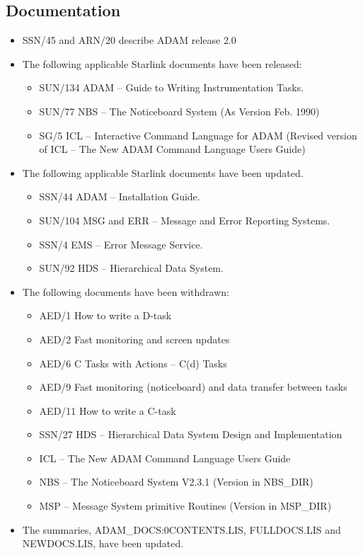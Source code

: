\subsection{Documentation}
\label{docs}
\begin{itemize}
\item SSN/45 and ARN/20 describe ADAM release 2.0
\item The following applicable Starlink documents have been released:
\begin{itemize}
\item SUN/134 ADAM -- Guide to Writing Instrumentation Tasks.
\item SUN/77 NBS -- The Noticeboard System (As Version Feb. 1990)
\item SG/5 ICL -- Interactive Command Language for ADAM (Revised version of
ICL -- The New ADAM Command Language Users Guide)
\end{itemize}
\item The following applicable Starlink documents have been updated.
\begin{itemize}
\item SSN/44 ADAM -- Installation Guide.
\item SUN/104 MSG and ERR -- Message and Error Reporting Systems.
\item SSN/4 EMS -- Error Message Service.
\item SUN/92 HDS -- Hierarchical Data System.
\end{itemize}
\item The following documents have been withdrawn:
\begin{itemize}
\item AED/1 How to write a D-task
\item AED/2 Fast monitoring and screen updates
\item AED/6 C Tasks with Actions -- C(d) Tasks
\item AED/9 Fast monitoring (noticeboard) and data transfer between tasks
\item AED/11 How to write a C-task
\item SSN/27 HDS -- Hierarchical Data System Design and Implementation
\item ICL -- The New ADAM Command Language Users Guide
\item NBS -- The Noticeboard System V2.3.1 (Version in NBS\_DIR)
\item MSP -- Message System primitive Routines (Version in MSP\_DIR)
\end{itemize}

\item The summaries, ADAM\_DOCS:0CONTENTS.LIS, FULLDOCS.LIS and NEWDOCS.LIS,
have been updated. 
\end{itemize}


